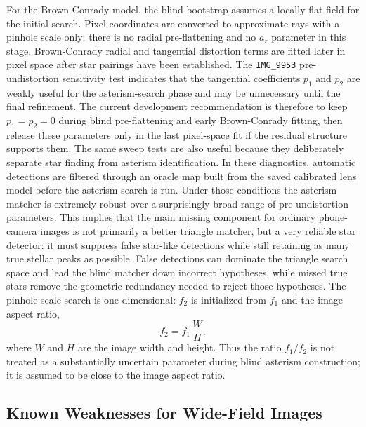 \documentclass[11pt]{article}
\begin{document}
For the Brown-Conrady model, the blind bootstrap assumes a locally flat field
for the initial search. Pixel coordinates are converted to approximate rays
with a pinhole scale only; there is no radial pre-flattening and no \(a_r\)
parameter in this stage. Brown-Conrady radial and tangential distortion terms
are fitted later in pixel space after star pairings have been established.
The \texttt{IMG\_9953} pre-undistortion sensitivity test indicates that the
tangential coefficients \(p_1\) and \(p_2\) are weakly useful for the
asterism-search phase and may be unnecessary until the final refinement.
The current development recommendation is therefore to keep
\(p_1=p_2=0\) during blind pre-flattening and early Brown-Conrady fitting,
then release these parameters only in the last pixel-space fit if the residual
structure supports them.
The same sweep tests are also useful because they deliberately separate star
finding from asterism identification. In these diagnostics, automatic
detections are filtered through an oracle map built from the saved calibrated
lens model before the asterism search is run. Under those conditions the
asterism matcher is extremely robust over a surprisingly broad range of
pre-undistortion parameters. This implies that the main missing component for
ordinary phone-camera images is not primarily a better triangle matcher, but a
very reliable star detector: it must suppress false star-like detections while
still retaining as many true stellar peaks as possible. False detections can
dominate the triangle search space and lead the blind matcher down incorrect
hypotheses, while missed true stars remove the geometric redundancy needed to
reject those hypotheses.
The pinhole scale search is one-dimensional: \(f_2\) is initialized from
\(f_1\) and the image aspect ratio,
\begin{equation}
  f_2 = f_1\,\frac{W}{H},
\end{equation}
where \(W\) and \(H\) are the image width and height. Thus the ratio
\(f_1/f_2\) is not treated as a substantially uncertain parameter during blind
asterism construction; it is assumed to be close to the image aspect ratio.

\subsection{Known Weaknesses for Wide-Field Images}
\end{document}
